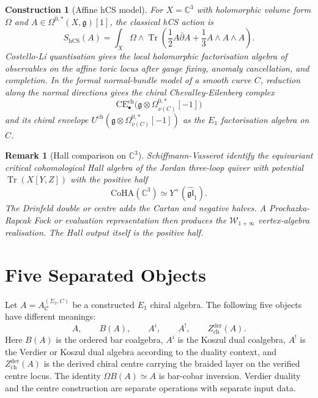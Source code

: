 \documentclass[11pt]{article}
\newtheorem{remark}[theorem]{Remark}
\newtheorem{construction}[theorem]{Construction}
\begin{document}
\begin{construction}[Affine hCS model]
\label{cons:affine-hcs}
For $X=\mathbb C^3$ with holomorphic volume form $\Omega$ and
$A\in\Omega^{0,*}(X,\mathfrak g)[1]$, the classical hCS action is
\[
  S_{\mathrm{hCS}}(A)
  =
  \int_X \Omega\wedge
  \operatorname{Tr}\left(
  \frac12 A\bar\partial A+\frac13 A\wedge A\wedge A
  \right).
\]
Costello-Li quantisation gives the local holomorphic factorisation
algebra of observables on the affine toric locus after gauge fixing,
anomaly cancellation, and completion.  In the formal normal-bundle model
of a smooth curve $C$, reduction along the normal directions gives the
chiral Chevalley-Eilenberg complex
\[
  \mathrm{CE}^{\mathrm{ch}}_{\bullet}
  \bigl(\mathfrak g\otimes\Omega^{0,*}_{\nu(C)}[-1]\bigr)
\]
and its chiral envelope
$U^{\mathrm{ch}}(\mathfrak g\otimes\Omega^{0,*}_{\nu(C)}[-1])$ as the
$E_1$ factorisation algebra on $C$.
\end{construction}

\begin{remark}[Hall comparison on $\mathbb C^3$]
\label{rem:c3-hall}
Schiffmann-Vasserot identify the equivariant critical cohomological
Hall algebra of the Jordan three-loop quiver with potential
$\operatorname{Tr}(X[Y,Z])$ with the positive half
\[
  \mathrm{CoHA}(\mathbb C^3)\simeq
  Y^+(\widehat{\mathfrak{gl}}_1).
\]
The Drinfeld double or centre adds the Cartan and negative halves.  A
Prochazka-Rapcak Fock or evaluation representation then produces the
$\mathcal W_{1+\infty}$ vertex-algebra realisation.  The Hall output
itself is the positive half.
\end{remark}

\section{Five Separated Objects}
\label{sec:five-objects}

Let $A=A_{\mathcal C}^{(\Sigma_2,C)}$ be a constructed $E_1$ chiral
algebra.  The following five objects have different meanings:
\[
  A,\qquad
  B(A),\qquad
  A^i,\qquad
  A^!,\qquad
  Z^{\mathrm{der}}_{\mathrm{ch}}(A).
\]
Here $B(A)$ is the ordered bar coalgebra, $A^i$ is the Koszul dual
coalgebra, $A^!$ is the Verdier or Koszul dual algebra according to the
duality context, and $Z^{\mathrm{der}}_{\mathrm{ch}}(A)$ is the derived
chiral centre carrying the braided layer on the verified centre locus.
The identity $\Omega B(A)\simeq A$ is bar-cobar inversion.  Verdier
duality and the centre construction are separate operations with
separate input data.
\end{document}
